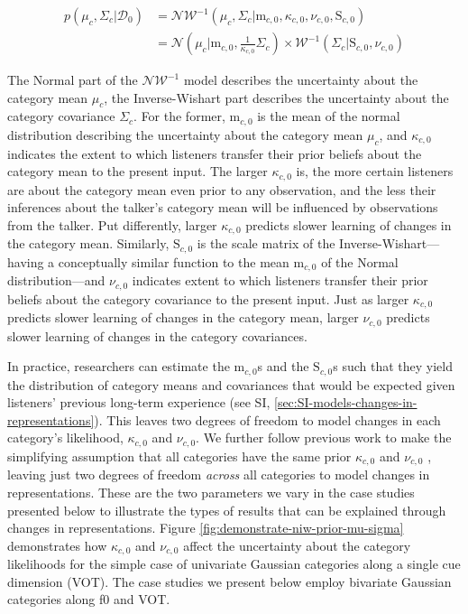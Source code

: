 \documentclass[
  11pt,
  man,floatsintext]{apa6}
\begin{document}
\begin{equation}\label{eq:niw-updating}
\begin{split}
p\left( \mu_c, \Sigma_c | \mathcal{D}_0 \right) & = \mathcal{NW}^{-1} \left( \mu_c, \Sigma_c | \mathrm{m}_{c,0}, \kappa_{c,0}, \nu_{c,0}, \mathrm{S}_{c,0} \right) \\
& = \mathcal{N}\left( \mu_c | \mathrm{m}_{c,0}, \frac{1}{\kappa_{c,0}} \Sigma_{c} \right) \times \mathcal{W}^{-1}\left( \Sigma_c | \mathrm{S}_{c,0}, \nu_{c,0} \right)
\end{split}
\end{equation}

The Normal part of the \(\mathcal{NW^{-1}}\) model describes the uncertainty about the category mean \(\mu_c\), the Inverse-Wishart part describes the uncertainty about the category covariance \(\Sigma_c\). For the former, \(\mathrm{m}_{c,0}\) is the mean of the normal distribution describing the uncertainty about the category mean \(\mu_c\), and \(\kappa_{c,0}\) indicates the extent to which listeners transfer their prior beliefs about the category mean to the present input. The larger \(\kappa_{c,0}\) is, the more certain listeners are about the category mean even prior to any observation, and the less their inferences about the talker's category mean will be influenced by observations from the talker. Put differently, larger \(\kappa_{c,0}\) predicts slower learning of changes in the category mean. Similarly, \(\mathrm{S}_{c,0}\) is the scale matrix of the Inverse-Wishart---having a conceptually similar function to the mean \(\mathrm{m}_{c,0}\) of the Normal distribution---and \(\nu_{c,0}\) indicates extent to which listeners transfer their prior beliefs about the category covariance to the present input. Just as larger \(\kappa_{c,0}\) predicts slower learning of changes in the category mean, larger \(\nu_{c,0}\) predicts slower learning of changes in the category covariances.

In practice, researchers can estimate the \(\mathrm{m}_{c,0}\)s and the \(\mathrm{S}_{c,0}\)s such that they yield the distribution of category means and covariances that would be expected given listeners' previous long-term experience (see SI, \ref{sec:SI-models-changes-in-representations}). This leaves two degrees of freedom to model changes in each category's likelihood, \(\kappa_{c,0}\) and \(\nu_{c,0}\). We further follow previous work to make the simplifying assumption that all categories have the same prior \(\kappa_{c,0}\) and \(\nu_{c,0}\) \autocite{kleinschmidt-jaeger2015,kleinschmidt-jaeger2016cogsci}, leaving just two degrees of freedom \emph{across} all categories to model changes in representations. These are the two parameters we vary in the case studies presented below to illustrate the types of results that can be explained through changes in representations. Figure \ref{fig:demonstrate-niw-prior-mu-sigma} demonstrates how \(\kappa_{c,0}\) and \(\nu_{c,0}\) affect the uncertainty about the category likelihoods for the simple case of univariate Gaussian categories along a single cue dimension (VOT). The case studies we present below employ bivariate Gaussian categories along f0 and VOT.
\end{document}
